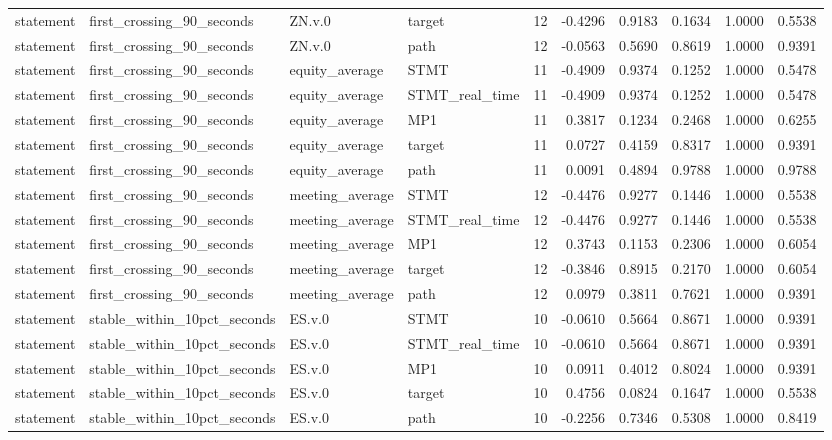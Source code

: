 \begin{tabular}{llllrrrrrr}
statement & first_crossing_90_seconds & ZN.v.0 & target & 12 & -0.4296 & 0.9183 & 0.1634 & 1.0000 & 0.5538 \\
statement & first_crossing_90_seconds & ZN.v.0 & path & 12 & -0.0563 & 0.5690 & 0.8619 & 1.0000 & 0.9391 \\
statement & first_crossing_90_seconds & equity_average & STMT & 11 & -0.4909 & 0.9374 & 0.1252 & 1.0000 & 0.5478 \\
statement & first_crossing_90_seconds & equity_average & STMT_real_time & 11 & -0.4909 & 0.9374 & 0.1252 & 1.0000 & 0.5478 \\
statement & first_crossing_90_seconds & equity_average & MP1 & 11 & 0.3817 & 0.1234 & 0.2468 & 1.0000 & 0.6255 \\
statement & first_crossing_90_seconds & equity_average & target & 11 & 0.0727 & 0.4159 & 0.8317 & 1.0000 & 0.9391 \\
statement & first_crossing_90_seconds & equity_average & path & 11 & 0.0091 & 0.4894 & 0.9788 & 1.0000 & 0.9788 \\
statement & first_crossing_90_seconds & meeting_average & STMT & 12 & -0.4476 & 0.9277 & 0.1446 & 1.0000 & 0.5538 \\
statement & first_crossing_90_seconds & meeting_average & STMT_real_time & 12 & -0.4476 & 0.9277 & 0.1446 & 1.0000 & 0.5538 \\
statement & first_crossing_90_seconds & meeting_average & MP1 & 12 & 0.3743 & 0.1153 & 0.2306 & 1.0000 & 0.6054 \\
statement & first_crossing_90_seconds & meeting_average & target & 12 & -0.3846 & 0.8915 & 0.2170 & 1.0000 & 0.6054 \\
statement & first_crossing_90_seconds & meeting_average & path & 12 & 0.0979 & 0.3811 & 0.7621 & 1.0000 & 0.9391 \\
statement & stable_within_10pct_seconds & ES.v.0 & STMT & 10 & -0.0610 & 0.5664 & 0.8671 & 1.0000 & 0.9391 \\
statement & stable_within_10pct_seconds & ES.v.0 & STMT_real_time & 10 & -0.0610 & 0.5664 & 0.8671 & 1.0000 & 0.9391 \\
statement & stable_within_10pct_seconds & ES.v.0 & MP1 & 10 & 0.0911 & 0.4012 & 0.8024 & 1.0000 & 0.9391 \\
statement & stable_within_10pct_seconds & ES.v.0 & target & 10 & 0.4756 & 0.0824 & 0.1647 & 1.0000 & 0.5538 \\
statement & stable_within_10pct_seconds & ES.v.0 & path & 10 & -0.2256 & 0.7346 & 0.5308 & 1.0000 & 0.8419 \\

\end{tabular}
